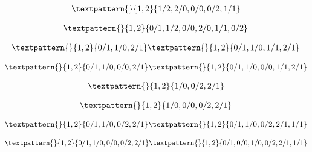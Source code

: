 \begin{equation}
	\begin{gathered}
		\textpattern{}{1,2}{1/2,2/0,0/0,0/2,1/1}
	\end{gathered}
	\label{cls:31}
\end{equation}

\begin{equation}
	\begin{gathered}
		\textpattern{}{1,2}{0/1,1/2,0/0,2/0,1/1,0/2}
	\end{gathered}
	\label{cls:32}
\end{equation}

\begin{equation}
	\begin{gathered}
		\textpattern{}{1,2}{0/1,1/0,2/1}
		\textpattern{}{1,2}{0/1,1/0,1/1,2/1}
	\end{gathered}
	\label{cls:33}
\end{equation}

\begin{equation}
	\begin{gathered}
		\textpattern{}{1,2}{0/1,1/0,0/0,2/1}
		\textpattern{}{1,2}{0/1,1/0,0/0,1/1,2/1}
	\end{gathered}
	\label{cls:34}
\end{equation}

\begin{equation}
	\begin{gathered}
		\textpattern{}{1,2}{1/0,0/2,2/1}
	\end{gathered}
	\label{cls:35}
\end{equation}

\begin{equation}
	\begin{gathered}
		\textpattern{}{1,2}{1/0,0/0,0/2,2/1}
	\end{gathered}
	\label{cls:36}
\end{equation}

\begin{equation}
	\begin{gathered}
		\textpattern{}{1,2}{0/1,1/0,0/2,2/1}
		\textpattern{}{1,2}{0/1,1/0,0/2,2/1,1/1}
	\end{gathered}
	\label{cls:37}
\end{equation}

\begin{equation}
	\begin{gathered}
		\textpattern{}{1,2}{0/1,1/0,0/0,0/2,2/1}
		\textpattern{}{1,2}{0/1,0/0,1/0,0/2,2/1,1/1}
	\end{gathered}
	\label{cls:38}
\end{equation}

